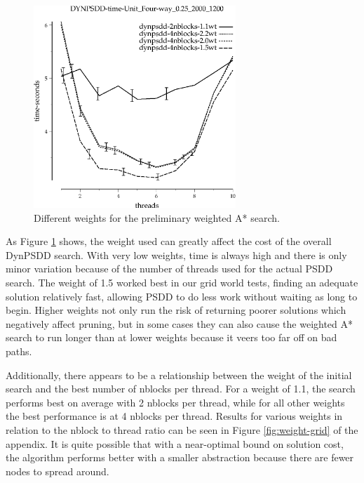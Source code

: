 \documentclass{article}
\begin{document}
\begin{figure}[h!]
\includegraphics[width=3in]{../graphs/grid_unit_four-way_0.25_2000_1200/DYNPSDD-time-Unit_Four-way_0.25_2000_1200.eps}
\caption{Different weights for the preliminary weighted A* search.}
\label{fig:DynPSDD-weight-grid}
\end{figure}

As Figure \ref{fig:DynPSDD-weight-grid} shows, the weight used can greatly affect the cost of the overall DynPSDD search. With very low weights, time is always high and there is only minor variation because of the number of threads used for the actual PSDD search. The weight of 1.5 worked best in our grid world tests, finding an adequate solution relatively fast, allowing PSDD to do less work without waiting as long to begin. Higher weights not only run the risk of returning poorer solutions which negatively affect pruning, but in some cases they can also cause the weighted A* search to run longer than at lower weights because it veers too far off on bad paths.

Additionally, there appears to be a relationship between the weight of the initial search and the best number of nblocks per thread. For a weight of 1.1, the search performs best on average with 2 nblocks per thread, while for all other weights the best performance is at 4 nblocks per thread. Results for various weights in relation to the nblock to thread ratio can be seen in Figure \ref{fig:weight-grid} of the appendix. It is quite possible that with a near-optimal bound on solution cost, the algorithm performs better with a smaller abstraction because there are fewer nodes to spread around.
\end{document}
